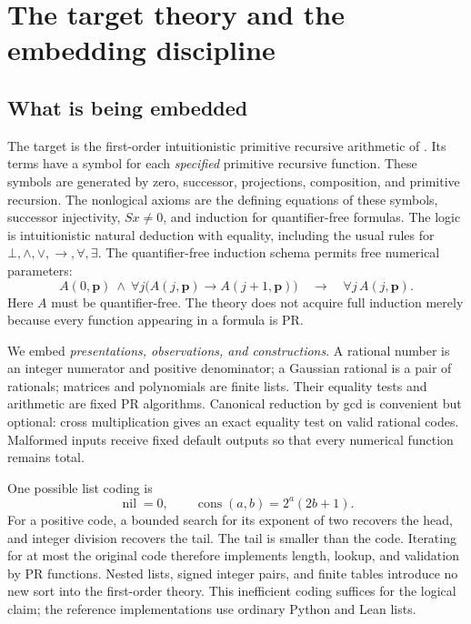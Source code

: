 \section{The target theory and the embedding discipline}
\label{sec:framework}

\subsection{What is being embedded}

The target is the first-order intuitionistic primitive recursive arithmetic
of  \cite{repo-core}.
Its terms have a symbol for each \emph{specified} primitive recursive
function. These symbols are generated by zero, successor, projections,
composition, and primitive recursion. The nonlogical axioms are the
defining equations of these symbols, successor injectivity,
$Sx\ne0$, and induction for quantifier-free formulas. The logic is
intuitionistic natural deduction with equality, including the usual rules
for $\bot,\wedge,\vee,\to,\forall,\exists$. The quantifier-free induction
schema permits free numerical parameters:
\[
 A(0,\mathbf p)\ \wedge\
 \forall j\bigl(A(j,\mathbf p)\to A(j+1,\mathbf p)\bigr)
 \quad\longrightarrow\quad\forall j\,A(j,\mathbf p).
\]
Here $A$ must be quantifier-free. The theory does not acquire full
induction merely because every function appearing in a formula is PR.

We embed \emph{presentations, observations, and constructions}. A rational
number is an integer numerator and positive denominator; a Gaussian
rational is a pair of rationals; matrices and polynomials are finite
lists. Their equality tests and arithmetic are fixed PR algorithms.
Canonical reduction by gcd is convenient but optional: cross
multiplication gives an exact equality test on valid rational codes.
Malformed inputs receive fixed default outputs so that every numerical
function remains total.

One possible list coding is
\[
 \operatorname{nil}=0,\qquad
 \operatorname{cons}(a,b)=2^a(2b+1).
\]
For a positive code, a bounded search for its exponent of two recovers
the head, and integer division recovers the tail. The tail is smaller
than the code. Iterating for at most the original code therefore
implements length, lookup, and validation by PR functions. Nested lists,
signed integer pairs, and finite tables introduce no new sort into the
first-order theory. This inefficient coding suffices for the logical
claim; the reference implementations use ordinary Python and Lean lists.

